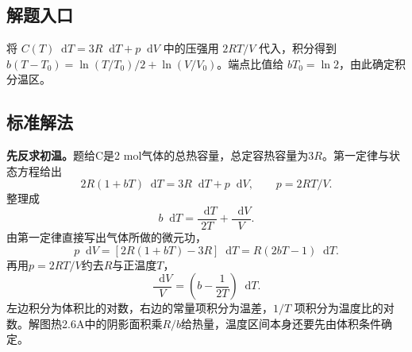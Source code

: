 \documentclass[UTF8,fontset=fandol,a4paper,11pt]{ctexart}
\newcommand{\dd}{\mathop{}\!\mathrm{d}}
\begin{document}


\subsection*{解题入口}

将 $C(T)\dd T=3R\dd T+p\dd V$ 中的压强用 $2RT/V$ 代入，积分得到 $b(T-T_0)=\ln(T/T_0)/2+\ln(V/V_0)$。端点比值给 $bT_0=\ln2$，由此确定积分温区。




\subsection*{标准解法}

\textbf{先反求初温。}题给C是2 mol气体的总热容量，总定容热容量为$3R$。第一定律与状态方程给出
\[2R(1+bT)\dd T=3R\dd T+p\dd V,\qquad p=2RT/V.\]
整理成
\[b\dd T=\frac{\dd T}{2T}+\frac{\dd V}{V}.\]
由第一定律直接写出气体所做的微元功，
\[p\dd V=[2R(1+bT)-3R]\dd T
=R(2bT-1)\dd T.\]
再用$p=2RT/V$约去$R$与正温度$T$，
\[\frac{\dd V}{V}=\left(b-\frac1{2T}\right)\dd T.\]
左边积分为体积比的对数，右边的常量项积分为温差，$1/T$ 项积分为温度比的对数。解图热2.6A中的阴影面积乘$R/b$给热量，温度区间本身还要先由体积条件确定。
\end{document}
